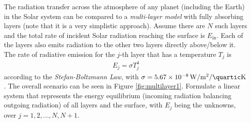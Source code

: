 \begin{exmp}
\label{exmp:multilayer1}
The radiation transfer across the atmosphere of any planet (including the Earth) in the Solar system can be compared to a \textit{multi-layer model} with fully absorbing layers (note that it is a very simplistic approach). Assume there are $N$ such layers and the total rate of incident Solar radiation reaching the surface is $E_{\text{in}}$. Each of the layers also emits radiation to the other two layers directly above/below it. The rate of radiative emission for the $j$-th layer that has a temperature $T_j$ is
\begin{align}
E_j = \sigma T_j^4    
\end{align}
according to the \textit{Stefan-Boltzmann Law}, with $\sigma = \SI{5.67e-8}{\W \per \square\m \per \quartic\K}$. The overall scenario can be seen in Figure \ref{fig:multilayer1}. Formulate a linear system that represents the energy equilibrium (incoming radiation balancing outgoing radiation) of all layers and the surface, with $E_j$ being the unknowns, over $j = 1, 2, \ldots, N, N+1$.
\end{exmp}
